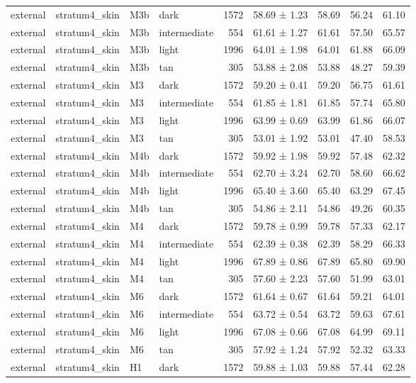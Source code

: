 \begin{tabular}{llllrlrrr}
external & stratum4\_skin & M3b & dark & 1572 & 58.69 ± 1.23 & 58.69 & 56.24 & 61.10 \\
external & stratum4\_skin & M3b & intermediate & 554 & 61.61 ± 1.27 & 61.61 & 57.50 & 65.57 \\
external & stratum4\_skin & M3b & light & 1996 & 64.01 ± 1.98 & 64.01 & 61.88 & 66.09 \\
external & stratum4\_skin & M3b & tan & 305 & 53.88 ± 2.08 & 53.88 & 48.27 & 59.39 \\
external & stratum4\_skin & M3 & dark & 1572 & 59.20 ± 0.41 & 59.20 & 56.75 & 61.61 \\
external & stratum4\_skin & M3 & intermediate & 554 & 61.85 ± 1.81 & 61.85 & 57.74 & 65.80 \\
external & stratum4\_skin & M3 & light & 1996 & 63.99 ± 0.69 & 63.99 & 61.86 & 66.07 \\
external & stratum4\_skin & M3 & tan & 305 & 53.01 ± 1.92 & 53.01 & 47.40 & 58.53 \\
external & stratum4\_skin & M4b & dark & 1572 & 59.92 ± 1.98 & 59.92 & 57.48 & 62.32 \\
external & stratum4\_skin & M4b & intermediate & 554 & 62.70 ± 3.24 & 62.70 & 58.60 & 66.62 \\
external & stratum4\_skin & M4b & light & 1996 & 65.40 ± 3.60 & 65.40 & 63.29 & 67.45 \\
external & stratum4\_skin & M4b & tan & 305 & 54.86 ± 2.11 & 54.86 & 49.26 & 60.35 \\
external & stratum4\_skin & M4 & dark & 1572 & 59.78 ± 0.99 & 59.78 & 57.33 & 62.17 \\
external & stratum4\_skin & M4 & intermediate & 554 & 62.39 ± 0.38 & 62.39 & 58.29 & 66.33 \\
external & stratum4\_skin & M4 & light & 1996 & 67.89 ± 0.86 & 67.89 & 65.80 & 69.90 \\
external & stratum4\_skin & M4 & tan & 305 & 57.60 ± 2.23 & 57.60 & 51.99 & 63.01 \\
external & stratum4\_skin & M6 & dark & 1572 & 61.64 ± 0.67 & 61.64 & 59.21 & 64.01 \\
external & stratum4\_skin & M6 & intermediate & 554 & 63.72 ± 0.54 & 63.72 & 59.63 & 67.61 \\
external & stratum4\_skin & M6 & light & 1996 & 67.08 ± 0.66 & 67.08 & 64.99 & 69.11 \\
external & stratum4\_skin & M6 & tan & 305 & 57.92 ± 1.24 & 57.92 & 52.32 & 63.33 \\
external & stratum4\_skin & H1 & dark & 1572 & 59.88 ± 1.03 & 59.88 & 57.44 & 62.28 \\

\end{tabular}
